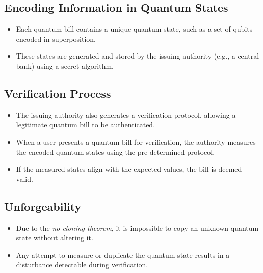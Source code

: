 \documentclass[11pt]{article}
\theoremstyle{definition}
\begin{document}
\subsection*{Encoding Information in Quantum States}
\begin{itemize}
    \item Each quantum bill contains a unique quantum state, such as a set of qubits encoded in superposition.
    \item These states are generated and stored by the issuing authority (e.g., a central bank) using a secret algorithm.
\end{itemize}

\subsection*{Verification Process}
\begin{itemize}
    \item The issuing authority also generates a verification protocol, allowing a legitimate quantum bill to be authenticated.
    \item When a user presents a quantum bill for verification, the authority measures the encoded quantum states using the pre-determined protocol.
    \item If the measured states align with the expected values, the bill is deemed valid.
\end{itemize}

\subsection*{Unforgeability}
\begin{itemize}
    \item Due to the \textit{no-cloning theorem}, it is impossible to copy an unknown quantum state without altering it.
    \item Any attempt to measure or duplicate the quantum state results in a disturbance detectable during verification.
\end{itemize}
\end{document}
